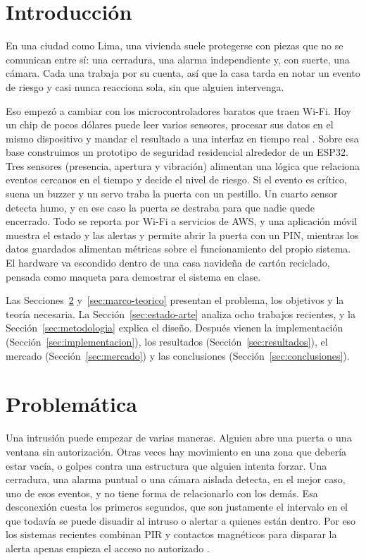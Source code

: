 \documentclass[manuscript,screen,nonacm]{acmart}
\begin{document}
\section{Introducción}
\label{sec:introduccion}

En una ciudad como Lima, una vivienda suele protegerse con piezas que no se comunican entre sí: una cerradura, una alarma independiente y, con suerte, una cámara. Cada una trabaja por su cuenta, así que la casa tarda en notar un evento de riesgo y casi nunca reacciona sola, sin que alguien intervenga.

Eso empezó a cambiar con los microcontroladores baratos que traen Wi-Fi. Hoy un chip de pocos dólares puede leer varios sensores, procesar sus datos en el mismo dispositivo y mandar el resultado a una interfaz en tiempo real \cite{alfuqaha2015survey, oktafiani2025esp32}. Sobre esa base construimos un prototipo de seguridad residencial alrededor de un ESP32. Tres sensores (presencia, apertura y vibración) alimentan una lógica que relaciona eventos cercanos en el tiempo y decide el nivel de riesgo. Si el evento es crítico, suena un buzzer y un servo traba la puerta con un pestillo. Un cuarto sensor detecta humo, y en ese caso la puerta se destraba para que nadie quede encerrado. Todo se reporta por Wi-Fi a servicios de AWS, y una aplicación móvil muestra el estado y las alertas y permite abrir la puerta con un PIN, mientras los datos guardados alimentan métricas sobre el funcionamiento del propio sistema. El hardware va escondido dentro de una casa navideña de cartón reciclado, pensada como maqueta para demostrar el sistema en clase.

Las Secciones~\ref{sec:problematica} y~\ref{sec:marco-teorico} presentan el problema, los objetivos y la teoría necesaria. La Sección~\ref{sec:estado-arte} analiza ocho trabajos recientes, y la Sección~\ref{sec:metodologia} explica el diseño. Después vienen la implementación (Sección~\ref{sec:implementacion}), los resultados (Sección~\ref{sec:resultados}), el mercado (Sección~\ref{sec:mercado}) y las conclusiones (Sección~\ref{sec:conclusiones}).

\section{Problemática}
\label{sec:problematica}

Una intrusión puede empezar de varias maneras. Alguien abre una puerta o una ventana sin autorización. Otras veces hay movimiento en una zona que debería estar vacía, o golpes contra una estructura que alguien intenta forzar. Una cerradura, una alarma puntual o una cámara aislada detecta, en el mejor caso, uno de esos eventos, y no tiene forma de relacionarlo con los demás. Esa desconexión cuesta los primeros segundos, que son justamente el intervalo en el que todavía se puede disuadir al intruso o alertar a quienes están dentro. Por eso los sistemas recientes combinan PIR y contactos magnéticos para disparar la alerta apenas empieza el acceso no autorizado \cite{arinde2024multisensor}.
\end{document}
